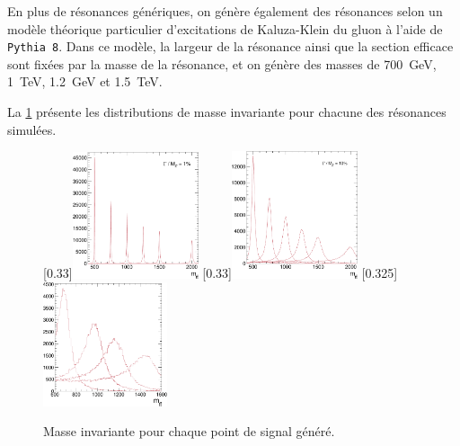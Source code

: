 \smallskip

En plus de résonances \zprime génériques, on génère également des résonances selon un modèle théorique particulier d'excitations de Kaluza-Klein du gluon \citep{Agashe:2006hk,Randall:1999vf} à l'aide de \texttt{Pythia 8}. Dans ce modèle, la largeur de la résonance ainsi que la section efficace sont fixées par la masse de la résonance, et on génère des masses de \SI{700}{\GeV}, \SI{1}{\TeV}, \SI{1.2}{\GeV} et \SI{1.5}{\TeV}.

\medskip

La \cref{fig:mtt_gen} présente les distributions de masse invariante \ttbar pour chacune des résonances simulées.

\begin{figure}[tbp] \centering
    [0.33\textwidth]{\includegraphics[width=0.33\textwidth]{chapitre7/figs/mtt_zprime_narrow_gen.pdf}} \hfill
    [0.33\textwidth]{\includegraphics[width=0.33\textwidth]{chapitre7/figs/mtt_zprime_large_gen.pdf}} \hfill
    \subcaptionbox{\kkglu}[0.325\textwidth]{\includegraphics[width=0.325\textwidth]{chapitre7/figs/mtt_rsgluons_gen.pdf}}
    \caption{Masse invariante \ttbar pour chaque point de signal généré.}
    \label{fig:mtt_gen}
\end{figure}

